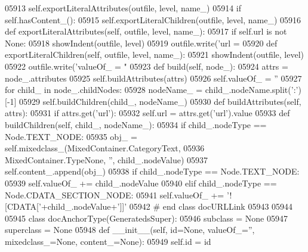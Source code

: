 \begin{DoxyCode}
{{{{{{{{{{{{{{{{{{{{{{{{{{{{{{{{{{{{{{{{{{{{{{{{{{{{{{{{{{{{{{{{{{{{{{{{{{{{{{{{{{{{{{{{{{{{{{{{{{{{{{{{{{{{{{{{{{{{{{{{{{{{{{{{{{{{{{{{{{{{{{{{{{{{{{{{{{{{{{{{{{{{{{{{{{{{{{{{{{{{{{{{{{{{{{{{{{{{{{{{{{{{{{{{{{{{{{{{{{{{{{{{{{{{{{{{{{{{{{{{{{{{{{{{{{{{{{{{{{{{{{{{{{{{{{{{{{{{{{{{{{{{{{{{{{{{{{{{{{{{{{{{{{{{{{{{{{{{{{{{{{{{{{{{{{{{{{{{{{{{{{{{{{{{{{{{{{{{{{{{{{{{{{05913         self.exportLiteralAttributes(outfile, level, name\_)
05914         \textcolor{keywordflow}{if} self.hasContent_():
05915             self.exportLiteralChildren(outfile, level, name\_)
05916     \textcolor{keyword}{def }exportLiteralAttributes(self, outfile, level, name\_):
05917         \textcolor{keywordflow}{if} self.url \textcolor{keywordflow}{is} \textcolor{keywordflow}{not} \textcolor{keywordtype}{None}:
05918             showIndent(outfile, level)
05919             outfile.write(\textcolor{stringliteral}{'url = %
05920     \textcolor{keyword}{def }exportLiteralChildren(self, outfile, level, name\_):
05921         showIndent(outfile, level)
05922         outfile.write(\textcolor{stringliteral}{'valueOf\_ = "%
05923     \textcolor{keyword}{def }build(self, node\_):
05924         attrs = node\_.attributes
05925         self.buildAttributes(attrs)
05926         self.valueOf_ = \textcolor{stringliteral}{''}
05927         \textcolor{keywordflow}{for} child\_ \textcolor{keywordflow}{in} node\_.childNodes:
05928             nodeName\_ = child\_.nodeName.split(\textcolor{stringliteral}{':'})[-1]
05929             self.buildChildren(child\_, nodeName\_)
05930     \textcolor{keyword}{def }buildAttributes(self, attrs):
05931         \textcolor{keywordflow}{if} attrs.get(\textcolor{stringliteral}{'url'}):
05932             self.url = attrs.get(\textcolor{stringliteral}{'url'}).value
05933     \textcolor{keyword}{def }buildChildren(self, child\_, nodeName\_):
05934         \textcolor{keywordflow}{if} child\_.nodeType == Node.TEXT\_NODE:
05935             obj\_ = self.mixedclass_(MixedContainer.CategoryText,
05936                 MixedContainer.TypeNone, \textcolor{stringliteral}{''}, child\_.nodeValue)
05937             self.content\_.append(obj\_)
05938         \textcolor{keywordflow}{if} child\_.nodeType == Node.TEXT\_NODE:
05939             self.valueOf_ += child\_.nodeValue
05940         \textcolor{keywordflow}{elif} child\_.nodeType == Node.CDATA\_SECTION\_NODE:
05941             self.valueOf_ += \textcolor{stringliteral}{'![CDATA['}+child\_.nodeValue+\textcolor{stringliteral}{']]'}
05942 \textcolor{comment}{# end class docURLLink}
05943 
05944 
05945 \textcolor{keyword}{class }docAnchorType(GeneratedsSuper):
05946     subclass = \textcolor{keywordtype}{None}
05947     superclass = \textcolor{keywordtype}{None}
05948     \textcolor{keyword}{def }__init__(self, id=None, valueOf\_='', mixedclass\_=None, content\_=None):
05949         self.id = id
}}}}}}}}}}}}}}}}}}}}}}}}}}}}}}}}}}}}}}}}}}}}}}}}}}}}}}}}}}}}}}}}}}}}}}}}}}}}}}}}}}}}}}}}}}}}}}}}}}}}}}}}}}}}}}}}}}}}}}}}}}}}}}}}}}}}}}}}}}}}}}}}}}}}}}}}}}}}}}}}}}}}}}}}}}}}}}}}}}}}}}}}}}}}}}}}}}}}}}}}}}}}}}}}}}}}}}}}}}}}}}}}}}}}}}}}}}}}}}}}}}}}}}}}}}}}}}}}}}}}}}}}}}}}}}}}}}}}}}}}}}}}}}}}}}}}}}}}}}}}}}}}}}}}}}}}}}}}}}}}}}}}}}}}}}}}}}}}}}}}}}}}}}}}}}}}}}}}}}}}}}}}}}}}
\end{DoxyCode}
